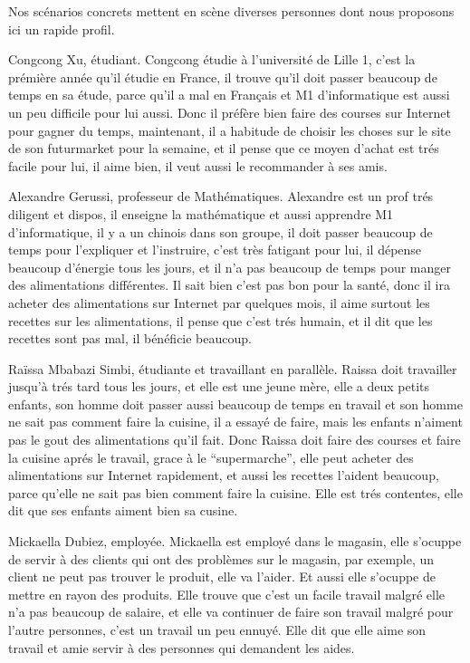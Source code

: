Nos scénarios concrets mettent en scène diverses personnes dont nous proposons ici un rapide profil.
\blank[big]

Congcong Xu, étudiant.\crlf
Congcong étudie à l'université de Lille 1, c'est la prémière année qu'il étudie en France, il trouve qu'il doit passer beaucoup de temps en sa étude, parce qu'il a mal en Français et M1 d'informatique  est aussi un peu difficile pour lui aussi. Donc il préfère bien faire des courses sur Internet pour gagner du temps, maintenant, il a habitude de choisir les choses sur le site de son futurmarket pour la semaine, et il pense que ce moyen d'achat est trés facile pour lui, il aime bien, il veut aussi le recommander à ses amis.
\stopfiguretext

Alexandre Gerussi, professeur de Mathématiques.\crlf
Alexandre est un prof trés diligent et dispos, il enseigne la mathématique et aussi apprendre M1 d'informatique, il y a un chinois dans son groupe, il doit passer beaucoup de temps pour l'expliquer et l'instruire, c'est très fatigant pour lui, il dépense beaucoup d'énergie tous les jours, et il n'a pas beaucoup de temps pour manger des alimentations différentes. Il sait bien c'est pas bon pour la santé, donc il ira acheter des alimentations sur Internet par quelques mois, il aime surtout les recettes sur les alimentations, il pense que c'est trés humain, et il dit que les recettes sont pas mal, il bénéficie beaucoup.
\stopfiguretext

Raïssa Mbabazi Simbi, étudiante et travaillant en parallèle.\crlf
Raissa doit travailler jusqu'à trés tard tous les jours, et elle est une jeune mère, elle a deux petits enfants, son homme doit passer aussi beaucoup de temps en travail et son homme ne sait pas comment faire la cuisine, il a essayé de faire, mais les enfants n'aiment pas le gout des alimentations qu'il fait. Donc Raissa doit faire des courses et faire la cuisine aprés le travail, grace à le “supermarche”, elle peut acheter des alimentations sur Internet rapidement, et aussi les recettes l'aident beaucoup, parce qu'elle ne sait pas bien comment faire la cuisine. Elle est trés contentes, elle dit que ses enfants aiment bien sa cusine.
\stopfiguretext

Mickaella Dubiez, employée.\crlf
Mickaella est employé dans le magasin, elle s'ocuppe de servir à des clients qui ont des problèmes sur le magasin, par exemple, un client ne peut pas trouver le produit, elle va l'aider. Et aussi elle s'ocuppe de mettre en rayon des produits. Elle trouve que c'est un facile travail malgré elle n'a pas beaucoup de salaire, et elle va continuer de faire son travail malgré pour l'autre personnes, c'est un travail un peu ennuyé. Elle dit que elle aime son travail et amie servir à des personnes qui demandent les aides.
\stopfiguretext

